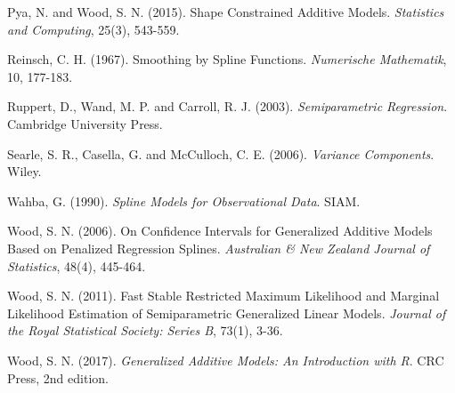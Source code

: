 \begin{References}
Pya, N. and Wood, S. N. (2015). Shape Constrained Additive Models.
\emph{Statistics and Computing}, 25(3), 543-559.

Reinsch, C. H. (1967). Smoothing by Spline Functions. \emph{Numerische
Mathematik}, 10, 177-183.

Ruppert, D., Wand, M. P. and Carroll, R. J. (2003).
\emph{Semiparametric Regression}. Cambridge University Press.

Searle, S. R., Casella, G. and McCulloch, C. E. (2006). \emph{Variance
Components}. Wiley.

Wahba, G. (1990). \emph{Spline Models for Observational Data}. SIAM.

Wood, S. N. (2006). On Confidence Intervals for Generalized Additive
Models Based on Penalized Regression Splines. \emph{Australian \& New
Zealand Journal of Statistics}, 48(4), 445-464.

Wood, S. N. (2011). Fast Stable Restricted Maximum Likelihood and Marginal
Likelihood Estimation of Semiparametric Generalized Linear Models.
\emph{Journal of the Royal Statistical Society: Series B}, 73(1), 3-36.

Wood, S. N. (2017). \emph{Generalized Additive Models: An Introduction
with R}. CRC Press, 2nd edition.
\end{References}
